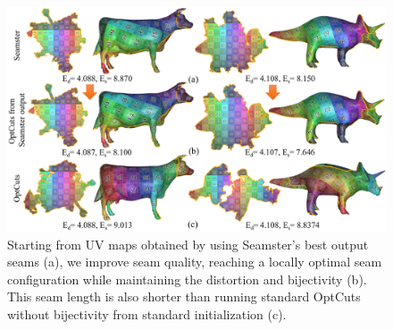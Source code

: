 
\begin{figure}[t]
\centering
\includegraphics[width=\linewidth]{fig/comp_Seamster.png}
\caption{Starting from UV maps obtained by using Seamster's best output seams (a), we improve seam quality, reaching a locally optimal seam configuration while maintaining the distortion and bijectivity (b). This seam length is also shorter than running standard OptCuts without bijectivity from standard initialization (c).}
\label{fig:comp_Seamster}
\end{figure}


